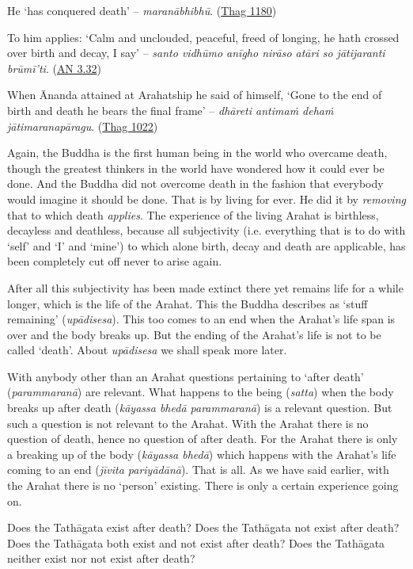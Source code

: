 He `has conquered death' -- \textit{maranābhibhū}. (\href{https://suttacentral.net/thag20.1/en/sujato}{Thag 1180})

To him applies: `Calm and unclouded, peaceful, freed of longing, he hath crossed over birth and decay, I say' -- \textit{santo vidhūmo anīgho nirāso atāri so jātijaranti brūmī'ti}. (\href{https://suttacentral.net/an3.32/en/bodhi}{AN 3.32})

When Ānanda attained at Arahatship he said of himself, `Gone to the end of birth and death he bears the final frame' -- \textit{dhāreti antimaṁ dehaṁ jātimaranapāragu}. (\href{https://suttacentral.net/thag17.3/en/sujato}{Thag 1022})

Again, the Buddha is the first human being in the world who overcame death, though the greatest thinkers in the world have wondered how it could ever be done. And the Buddha did not overcome death in the fashion that everybody would imagine it should be done. That is by living for ever. He did it by \emph{removing} that to which death \emph{applies}. The experience of the living Arahat is birthless, decayless and deathless, because all subjectivity (i.e. everything that is to do with `self' and `I' and `mine') to which alone birth, decay and death are applicable, has been completely cut off never to arise again.

After all this subjectivity has been made extinct there yet remains life for a while longer, which is the life of the Arahat. This the Buddha describes as `stuff remaining' (\textit{upādisesa}). This too comes to an end when the Arahat's life span is over and the body breaks up. But the ending of the Arahat's life is not to be called `death'. About \textit{upādisesa} we shall speak more later.

With anybody other than an Arahat questions pertaining to `after death' (\textit{parammaranā}) are relevant. What happens to the being (\textit{satta}) when the body breaks up after death (\textit{kāyassa bhedā parammaranā}) is a relevant question. But such a question is not relevant to the Arahat. With the Arahat there is no question of death, hence no question of after death. For the Arahat there is only a breaking up of the body (\textit{kāyassa bhedā}) which happens with the Arahat's life coming to an end (\textit{jīvita pariyādānā}). That is all. As we have said earlier, with the Arahat there is no `person' existing. There is only a certain experience going on.

Does the Tathāgata exist after death? Does the Tathāgata not exist after death? Does the Tathāgata both exist and not exist after death? Does the Tathāgata neither exist nor not exist after death?

